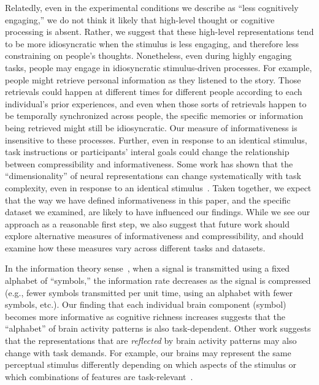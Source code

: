 \documentclass[english, 11pt]{article}
\begin{document}
Relatedly, even in the experimental conditions we describe as ``less
cognitively engaging,'' we do not think it likely that high-level thought or
cognitive processing is absent. Rather, we suggest that these high-level
representations tend to be more idiosyncratic when the stimulus is less
engaging, and therefore less constraining on people's thoughts. Nonetheless,
even during highly engaging tasks, people may engage in idiosyncratic
stimulus-driven processes. For example, people might retrieve personal
information as they listened to the story. Those retrievals could happen at
different times for different people according to each individual's prior
experiences, and even when those sorts of retrievals happen to be temporally
synchronized across people, the specific memories or information being
retrieved might still be idiosyncratic. Our measure of informativeness is
insensitive to these processes. Further, even in response to an identical
stimulus, task instructions or participants' interal goals could change the
relationship between compressibility and informativeness. Some work has shown
that the ``dimensionality'' of neural representations can change systematically
with task complexity, even in response to an identical
stimulus~\citep{MackEtal20}. Taken together, we expect that the way we have
defined informativeness in this paper, and the specific dataset we examined,
are likely to have influenced our findings. While we see our approach as a
reasonable first step, we also suggest that future work should explore
alternative measures of informativeness and compressibility, and should examine
how these measures vary across different tasks and datasets.

In the information theory sense~\citep{Shan48}, when a signal is transmitted
using a fixed alphabet of ``symbols,'' the information rate decreases as the
signal is compressed (e.g., fewer symbols transmitted per unit time, using an
alphabet with fewer symbols, etc.). Our finding that each individual brain
component (symbol) becomes more informative as cognitive richness increases
suggests that the ``alphabet'' of brain activity patterns is also
task-dependent. Other work suggests that the representations that are
\textit{reflected} by brain activity patterns may also change with task
demands. For example, our brains may represent the same perceptual stimulus
differently depending on which aspects of the stimulus or which combinations of
features are task-relevant~\citep{MackEtal20}.
\end{document}
